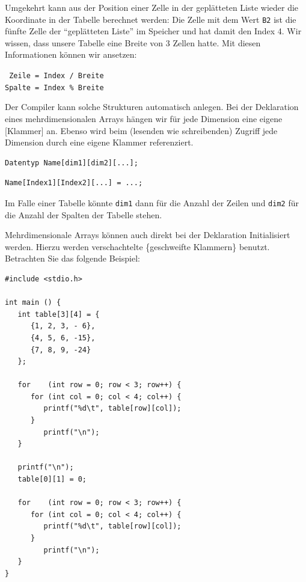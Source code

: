 Umgekehrt kann aus der Position einer Zelle in der geplätteten Liste wieder die Koordinate in der Tabelle berechnet werden: Die Zelle mit dem Wert \texttt{B2} ist die fünfte Zelle der \enquote{geplätteten Liste} im Speicher und hat damit den Index 4. Wir wissen, dass unsere Tabelle eine Breite von 3 Zellen hatte. Mit diesen Informationen können wir ansetzen:
\begin{center}
\texttt{ Zeile = Index / Breite}\\
\texttt{Spalte = Index \% Breite}
\end{center}

Der Compiler kann solche Strukturen automatisch anlegen. Bei der Deklaration eines mehrdimensionalen Arrays hängen wir für jede Dimension eine eigene [Klammer] an. Ebenso wird beim (lesenden wie schreibenden) Zugriff jede Dimension durch eine eigene Klammer referenziert.

\begin{codebox}
\begin{verbatim}
Datentyp Name[dim1][dim2][...];
\end{verbatim}
\end{codebox}

\begin{codebox}
\begin{verbatim}
Name[Index1][Index2][...] = ...;
\end{verbatim}
\end{codebox}

Im Falle einer Tabelle könnte \texttt{dim1} dann für die Anzahl der Zeilen und \texttt{dim2} für die Anzahl der Spalten der Tabelle stehen.

Mehrdimensionale Arrays können auch direkt bei der Deklaration Initialisiert werden. Hierzu werden verschachtelte \{geschweifte Klammern\} benutzt. Betrachten Sie das folgende Beispiel:

\begin{codebox}
\begin{verbatim}
#include <stdio.h>

int main () {
   int table[3][4] = {
      {1, 2, 3, - 6},
      {4, 5, 6, -15},
      {7, 8, 9, -24}
   };

   for    (int row = 0; row < 3; row++) {
      for (int col = 0; col < 4; col++) {
         printf("%d\t", table[row][col]);
      }
         printf("\n");
   }

   printf("\n");
   table[0][1] = 0;

   for    (int row = 0; row < 3; row++) {
      for (int col = 0; col < 4; col++) {
         printf("%d\t", table[row][col]);
      }
         printf("\n");
   }
}
\end{verbatim}
\end{codebox}

